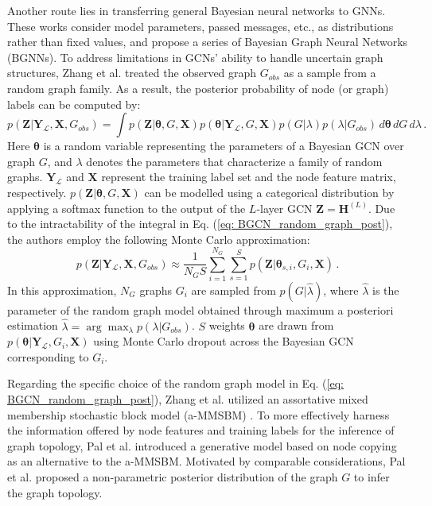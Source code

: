 Another route lies in transferring general Bayesian neural networks to GNNs. These works consider model parameters, passed messages, etc., as distributions rather than fixed values, and propose a series of Bayesian Graph Neural Networks (BGNNs).
To address limitations in GCNs' ability to handle uncertain graph structures, Zhang et al. \cite{zhang2019bayesian} treated the observed graph $G_{obs}$ as a sample from a random graph family. As a result, the posterior probability of node (or graph) labels can be computed by:
\begin{equation}
    \label{eq: BGCN_random_graph_post}
    p(\mathbf{Z}|\mathbf{Y}_{\mathcal{L}}, \mathbf{X}, G_{obs})=\int p(\mathbf{Z}|\boldsymbol{\theta}, G, \mathbf{X})p(\boldsymbol{\theta}|\mathbf{Y}_{\mathcal{L}}, G, \mathbf{X})p(G|\lambda)p(\lambda|G_{obs})\,d\boldsymbol{\theta}\,dG \,d\lambda\,.
\end{equation}
Here $\boldsymbol{\theta}$ is a random variable representing the parameters of a Bayesian GCN over graph $G$, and $\lambda$ denotes the parameters that characterize a family of random graphs. 
$\mathbf{Y}_{\mathcal{L}}$ and $\mathbf{X}$ represent the training label set and the node feature matrix, respectively.
$p(\mathbf{Z}|\boldsymbol{\theta}, G, \mathbf{X})$ can be modelled using a categorical distribution by applying a softmax function to the output of the $L$-layer GCN $\mathbf{Z}=\mathbf{H}^{(L)}$. 
Due to the intractability of the integral in Eq. (\ref{eq: BGCN_random_graph_post}), the authors employ the following Monte Carlo approximation:
\begin{equation}
    \label{eq: BGCN_random_graph_post_MC}
    p(\mathbf{Z}|\mathbf{Y}_{\mathcal{L}}, \mathbf{X}, G_{obs}) \approx \frac{1}{N_{G}S}\sum_{i=1}^{N_G}\sum_{s=1}^{S} p(\mathbf{Z}|\boldsymbol{\theta}_{s,i}, G_i, \mathbf{X})\,.
\end{equation}
In this approximation, $N_G$ graphs $G_i$ are sampled from $p(G|\hat{\lambda})$, where $\hat{\lambda}$ is the parameter of the random graph model obtained through maximum a posteriori estimation $\hat{\lambda}=\arg\max_{\lambda}p(\lambda|G_{obs})$. 
$S$ weights $\boldsymbol{\theta}$ are drawn from $p(\boldsymbol{\theta}|\mathbf{Y}_{\mathcal{L}}, G_i, \mathbf{X})$ using Monte Carlo dropout across the Bayesian GCN corresponding to $G_i$.

Regarding the specific choice of the random graph model in  Eq. (\ref{eq: BGCN_random_graph_post}), Zhang et al. \cite{zhang2019bayesian} utilized an assortative mixed membership stochastic block model (a-MMSBM) \cite{li2016scalable,gopalan2012scalable}. 
To more effectively harness the information offered by node features and training labels for the inference of graph topology, Pal et al. \cite{pal2019bayesian} introduced a generative model based on node copying as an alternative to the a-MMSBM. 
Motivated by comparable considerations, Pal et al. \cite{pal2020non} proposed a non-parametric posterior distribution of the graph $G$ to infer the graph topology.

